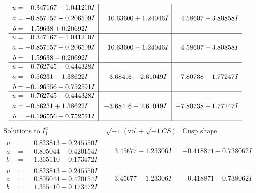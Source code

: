 \documentclass[1p]{elsarticle_modified}
\theoremstyle{definition}
\newcommand{\I}{\sqrt{-1}}
\begin{document}
$$\begin{array}{c|c|c}
\begin{aligned}
u &= \phantom{-}0.347167 + 1.041210 I \\
a &= -0.857157 - 0.206509 I \\
b &= \phantom{-}1.59638 + 0.20692 I\end{aligned}
 & \phantom{-}10.63600 + 1.24046 I & \phantom{-}4.58607 + 3.80858 I \\ \hline\begin{aligned}
u &= \phantom{-}0.347167 - 1.041210 I \\
a &= -0.857157 + 0.206509 I \\
b &= \phantom{-}1.59638 - 0.20692 I\end{aligned}
 & \phantom{-}10.63600 - 1.24046 I & \phantom{-}4.58607 - 3.80858 I \\ \hline\begin{aligned}
u &= \phantom{-}0.762745 + 0.444328 I \\
a &= -0.56231 - 1.38622 I \\
b &= -0.196556 - 0.752591 I\end{aligned}
 & -3.68416 + 2.61049 I & -7.80738 - 1.77247 I \\ \hline\begin{aligned}
u &= \phantom{-}0.762745 - 0.444328 I \\
a &= -0.56231 + 1.38622 I \\
b &= -0.196556 + 0.752591 I\end{aligned}
 & -3.68416 - 2.61049 I & -7.80738 + 1.77247 I\\
 \hline 
 \end{array}$$\newpage$$\begin{array}{c|c|c}  
\text{Solutions to }I^u_{1}& \I (\text{vol} + \sqrt{-1}CS) & \text{Cusp shape}\\
 \hline 
\begin{aligned}
u &= \phantom{-}0.823813 + 0.245550 I \\
a &= \phantom{-}0.805044 + 0.420154 I \\
b &= \phantom{-}1.365110 + 0.173472 I\end{aligned}
 & \phantom{-}3.45677 + 1.23306 I & -0.418871 + 0.738062 I \\ \hline\begin{aligned}
u &= \phantom{-}0.823813 - 0.245550 I \\
a &= \phantom{-}0.805044 - 0.420154 I \\
b &= \phantom{-}1.365110 - 0.173472 I\end{aligned}
 & \phantom{-}3.45677 - 1.23306 I & -0.418871 - 0.738062 I \\ \hline\begin{aligned}

\end{aligned}
\end{array}$$
\end{document}
